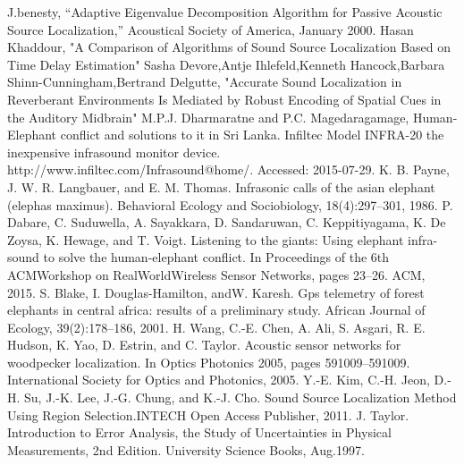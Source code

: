\documentclass[12pt]{article}
\numberwithin{figure}{section}
\numberwithin{table}{section}
\begin{document}
\begin{thebibliography}{1}
  J.benesty, “Adaptive Eigenvalue Decomposition Algorithm for Passive Acoustic Source Localization,” Acoustical Society of America, January 2000.
 Hasan Khaddour, "A Comparison of Algorithms of Sound Source Localization Based
on Time Delay Estimation"
 Sasha Devore,Antje Ihlefeld,Kenneth Hancock,Barbara Shinn-Cunningham,Bertrand Delgutte,
"Accurate Sound Localization in Reverberant Environments Is Mediated by Robust Encoding of Spatial Cues in the Auditory Midbrain"
M.P.J. Dharmaratne and P.C. Magedaragamage, Human-Elephant conflict and solutions to it in Sri Lanka.
 Infiltec Model INFRA-20 the inexpensive infrasound monitor device. http://www.infiltec.com/Infrasound@home/. Accessed: 2015-07-29.
 K. B. Payne, J. W. R. Langbauer, and E. M. Thomas. Infrasonic calls of the asian elephant (elephas maximus). Behavioral Ecology and Sociobiology, 18(4):297–301, 1986.
P. Dabare, C. Suduwella, A. Sayakkara, D. Sandaruwan, C. Keppitiyagama, K. De Zoysa, K. Hewage, and T. Voigt. Listening to the giants: Using elephant infra-sound to solve the human-elephant conflict. In Proceedings of the 6th ACMWorkshop on RealWorldWireless Sensor Networks, pages 23–26. ACM, 2015.
 S. Blake, I. Douglas-Hamilton, andW. Karesh. Gps telemetry of forest elephants in central africa: results of a preliminary study. African Journal of Ecology, 39(2):178–186, 2001.
H. Wang, C.-E. Chen, A. Ali, S. Asgari, R. E. Hudson, K. Yao, D. Estrin, and C. Taylor. Acoustic sensor networks for woodpecker localization. In Optics Photonics 2005, pages 591009–591009. International Society for Optics and Photonics, 2005.
Y.-E. Kim, C.-H. Jeon, D.-H. Su, J.-K. Lee, J.-G. Chung, and K.-J. Cho. Sound Source Localization Method Using Region Selection.INTECH Open Access Publisher, 2011.
J. Taylor. Introduction to Error Analysis, the Study of Uncertainties in Physical Measurements, 2nd Edition. University Science Books, Aug.1997.

\end{thebibliography}
\end{document}
